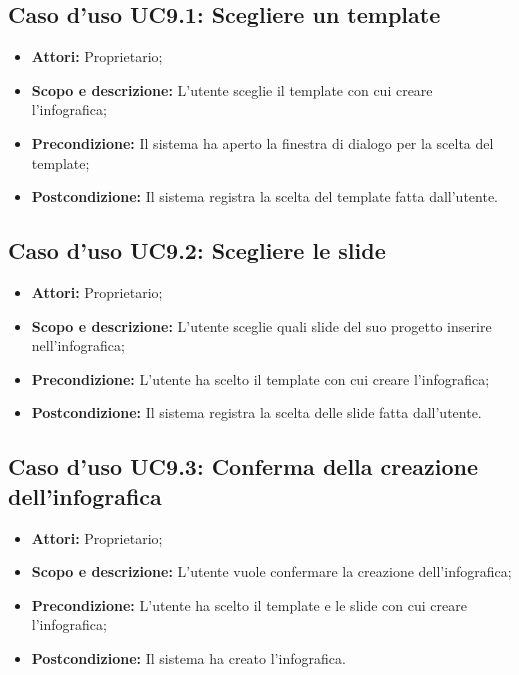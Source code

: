 \subsection{Caso d'uso UC9.1: Scegliere un template}
\begin{itemize}
	\item \textbf{Attori:} Proprietario;
	\item \textbf{Scopo e descrizione:} L'utente sceglie il template con cui creare l'infografica;
	\item \textbf{Precondizione:} Il sistema ha aperto la finestra di dialogo per la scelta del template;
	\item \textbf{Postcondizione:} Il sistema registra la scelta del template fatta dall'utente.
\end{itemize}


\subsection{Caso d'uso UC9.2: Scegliere le slide}
\begin{itemize}
\item \textbf{Attori:} Proprietario;
\item \textbf{Scopo e descrizione:} L'utente sceglie quali slide del suo progetto inserire nell'infografica;
\item \textbf{Precondizione:} L'utente ha scelto il template con cui creare l'infografica;
\item \textbf{Postcondizione:} Il sistema registra la scelta delle slide fatta dall'utente.
\end{itemize}


\subsection{Caso d'uso UC9.3: Conferma della creazione dell'infografica}
\begin{itemize}
\item \textbf{Attori:} Proprietario;
\item \textbf{Scopo e descrizione:} L'utente vuole confermare la creazione dell'infografica;
\item \textbf{Precondizione:} L'utente ha scelto il template e le slide con cui creare l'infografica;
\item \textbf{Postcondizione:} Il sistema ha creato l'infografica.
\end{itemize}